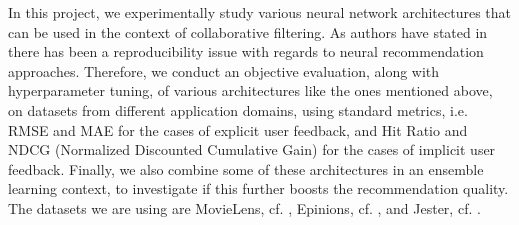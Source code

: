 In this project, we experimentally study various neural network architectures that can be used in the context of collaborative filtering.
As authors have stated in \cite{dacrema2019we} there has been a reproducibility issue with regards to neural recommendation approaches. 
Therefore, we conduct an objective evaluation, along with hyperparameter tuning, of various architectures like the ones mentioned above, on datasets from different application domains, using standard metrics, i.e. RMSE and MAE for the cases of explicit user feedback, and Hit Ratio and NDCG (Normalized Discounted Cumulative Gain) for the cases of implicit user feedback. 
Finally, we also combine some of these architectures in an ensemble learning context, to investigate if this further boosts the recommendation quality. 
The datasets we are using are MovieLens, cf. \cite{harper2016movielens}, Epinions, cf. \cite{snapnets}, and Jester, cf. \cite{jester}.

